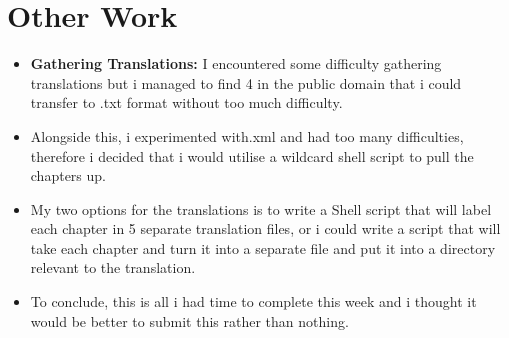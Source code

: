 \documentclass{article}
\begin{document}
\section{Other Work}
\begin{itemize}
\item{\textbf{Gathering Translations:} I encountered some difficulty gathering translations but i managed to find 4 in the public domain that i could transfer to .txt format without too much difficulty.}
\item{Alongside this, i experimented with.xml and had too many difficulties, therefore i decided that i would utilise a wildcard shell script to pull the chapters up.}
\item{My two options for the translations is to write a Shell script that will label each chapter in 5 separate translation files, or i could write a script that will take each chapter and turn it into a separate file and put it into a directory relevant to the translation.}
\end{itemize}

\begin{itemize}
    \item{To conclude, this is all i had time to complete this week and i thought it would be better to submit this rather than nothing.}
\end{itemize}
\end{document}
